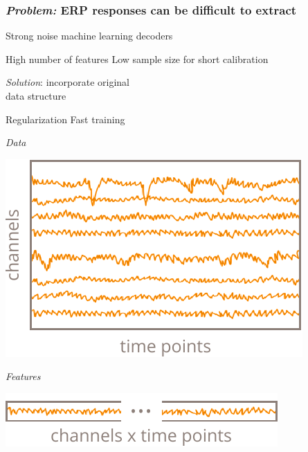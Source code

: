 \documentclass{kul-ulille-beamer}
\begin{document}
\begin{frame}[c]
  \frametitle{\emph{Problem:} ERP responses can be difficult to extract}
  \begin{minipage}[c]{.5\textwidth}

    Strong noise \ergo machine learning decoders
    \begin{itemize}
      \itemnega High number of features
      \itemnega Low sample size for short calibration
    \end{itemize}
    \bigskip

    \emph{Solution}: incorporate original \\ data structure
    \begin{itemize}
      \itemposi Regularization
      \itemposi Fast training
    \end{itemize}


  \end{minipage}\hfill%
  \begin{minipage}[c]{.4\textwidth}
    \centering

    \emph{Data}\smallskip

    \includegraphics[width=\textwidth]{figures/decode/epoch.pdf}

    \downarrow\smallskip

    \emph{Features}\smallskip

    \includegraphics[width=.9\textwidth]{figures/decode/features.pdf}

  \end{minipage}
\end{frame}
\end{document}
